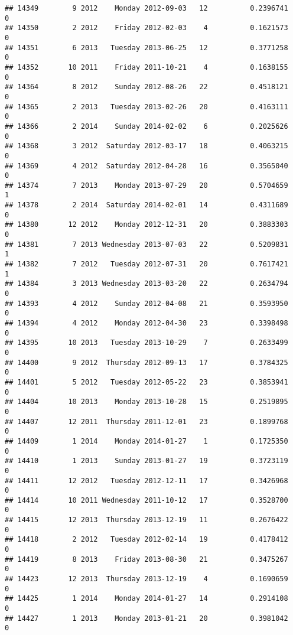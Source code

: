 \documentclass[
]{article}
\begin{document}
\begin{verbatim}
## 14349        9 2012    Monday 2012-09-03   12          0.2396741             0
## 14350        2 2012    Friday 2012-02-03    4          0.1621573             0
## 14351        6 2013   Tuesday 2013-06-25   12          0.3771258             0
## 14352       10 2011    Friday 2011-10-21    4          0.1638155             0
## 14364        8 2012    Sunday 2012-08-26   22          0.4518121             0
## 14365        2 2013   Tuesday 2013-02-26   20          0.4163111             0
## 14366        2 2014    Sunday 2014-02-02    6          0.2025626             0
## 14368        3 2012  Saturday 2012-03-17   18          0.4063215             0
## 14369        4 2012  Saturday 2012-04-28   16          0.3565040             0
## 14374        7 2013    Monday 2013-07-29   20          0.5704659             1
## 14378        2 2014  Saturday 2014-02-01   14          0.4311689             0
## 14380       12 2012    Monday 2012-12-31   20          0.3883303             0
## 14381        7 2013 Wednesday 2013-07-03   22          0.5209831             1
## 14382        7 2012   Tuesday 2012-07-31   20          0.7617421             1
## 14384        3 2013 Wednesday 2013-03-20   22          0.2634794             0
## 14393        4 2012    Sunday 2012-04-08   21          0.3593950             0
## 14394        4 2012    Monday 2012-04-30   23          0.3398498             0
## 14395       10 2013   Tuesday 2013-10-29    7          0.2633499             0
## 14400        9 2012  Thursday 2012-09-13   17          0.3784325             0
## 14401        5 2012   Tuesday 2012-05-22   23          0.3853941             0
## 14404       10 2013    Monday 2013-10-28   15          0.2519895             0
## 14407       12 2011  Thursday 2011-12-01   23          0.1899768             0
## 14409        1 2014    Monday 2014-01-27    1          0.1725350             0
## 14410        1 2013    Sunday 2013-01-27   19          0.3723119             0
## 14411       12 2012   Tuesday 2012-12-11   17          0.3426968             0
## 14414       10 2011 Wednesday 2011-10-12   17          0.3528700             0
## 14415       12 2013  Thursday 2013-12-19   11          0.2676422             0
## 14418        2 2012   Tuesday 2012-02-14   19          0.4178412             0
## 14419        8 2013    Friday 2013-08-30   21          0.3475267             0
## 14423       12 2013  Thursday 2013-12-19    4          0.1690659             0
## 14425        1 2014    Monday 2014-01-27   14          0.2914108             0
## 14427        1 2013    Monday 2013-01-21   20          0.3981042             0

\end{verbatim}
\end{document}
